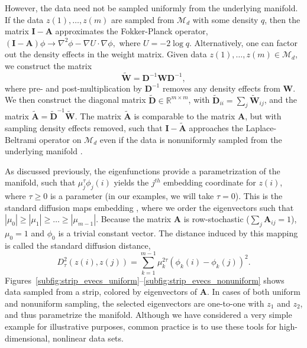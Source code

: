However, the data need not be sampled uniformly from the underlying manifold.
%
If the data $z(1), \dots, z(m)$ are sampled from $\mathcal{M}_d$ with some density $q$, then the matrix $\mathbf{I}-\mathbf{A}$ approximates the Fokker-Planck operator,
$%
(\mathbf{I}-\mathbf{A}) \phi \rightarrow \nabla^2 \phi - \nabla U \cdot \nabla \phi,
$ %
where $U = -2 \log q$.
%
Alternatively, one can factor out the density effects in the weight matrix.
%
Given data $z(1), \dots, z(m) \in \mathcal{M}_d$, we construct the matrix
%
\begin{equation}
\tilde{\mathbf{W}} = \mathbf{D}^{-1} \mathbf{W} \mathbf{D}^{-1},
\end{equation}
%
where pre- and post-multiplication by $\mathbf{D}^{-1}$ removes any density effects from $\mathbf{W}$.
%
We then construct the diagonal matrix $\tilde{\mathbf{D}} \in \mathbb{R}^{m \times m}$, with $\tilde{\mathbf{D}}_{ii} = \sum_j \tilde{\mathbf{W}}_{ij}$, and the matrix $\tilde{\mathbf{A}}  = \tilde{\mathbf{D}}^{-1} \tilde{\mathbf{W}}.$
%
The matrix $\tilde{\mathbf{A}}$ is comparable to the matrix $\mathbf{A}$, but with sampling density effects removed, such that $\mathbf{I}-\tilde{\mathbf{A}}$ approaches the Laplace-Beltrami operator on $\mathcal{M}_d$ even if the data is nonuniformly sampled from the underlying manifold \cite{coifman2005geometric}.

As discussed previously, the eigenfunctions provide a parametrization of the manifold, such that $\mu_j^\tau \phi_{j}(i)$ yields the $j^{th}$ embedding coordinate for $z(i)$, where $\tau \ge 0$ is a parameter (in our examples, we will take $\tau=0$).
%
This is the standard diffusion maps embedding \cite{coifman2005geometric, coifman2006geometric}, where we order the eigenvectors such that $|\mu_0| \ge |\mu_1| \ge \dots \ge |\mu_{m-1}|$.
%
Because the matrix $\mathbf{A}$ is row-stochastic ($\sum_j \mathbf{A}_{ij} = 1$),  $\mu_0 = 1$ and $\phi_0$ is a trivial constant vector.
%
The distance induced by this mapping is called the standard diffusion distance,
%
\begin{equation}
D^2_\tau(z(i), z(j)) = \sum_{k=1}^{m-1} \mu_k^{2 \tau} \left( \phi_k(i) - \phi_k(j)  \right)^2.
\end{equation}
%
Figures~\ref{subfig:strip_evecs_uniform}--\ref{subfig:strip_evecs_nonuniform} shows data sampled from a strip, colored by eigenvectors of $\mathbf{A}$.
%
In cases of both uniform and nonuniform sampling, the selected eigenvectors are one-to-one with $z_1$ and $z_2$, and thus parametrize the manifold.
%
Although we have considered a very simple example for illustrative purposes, common practice is to use these tools for high-dimensional, nonlinear data sets.

